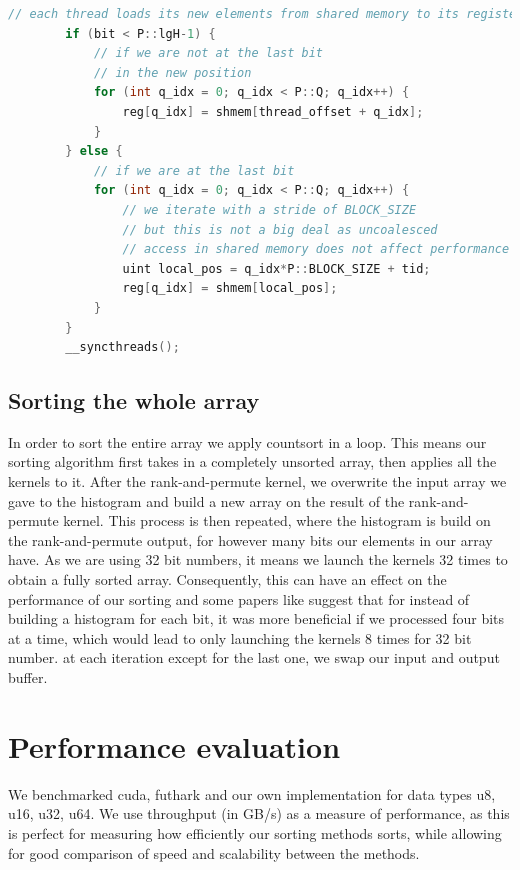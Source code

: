 \documentclass{article}
\begin{document}
\begin{lstlisting}[language=c++]
        // each thread loads its new elements from shared memory to its registers
        if (bit < P::lgH-1) {
            // if we are not at the last bit
            // in the new position
            for (int q_idx = 0; q_idx < P::Q; q_idx++) {
                reg[q_idx] = shmem[thread_offset + q_idx];
            }
        } else {
            // if we are at the last bit
            for (int q_idx = 0; q_idx < P::Q; q_idx++) {
                // we iterate with a stride of BLOCK_SIZE
                // but this is not a big deal as uncoalesced 
                // access in shared memory does not affect performance
                uint local_pos = q_idx*P::BLOCK_SIZE + tid;
                reg[q_idx] = shmem[local_pos];
            }
        }
        __syncthreads();
\end{lstlisting}


\subsection{Sorting the whole array}


In order to sort the entire array we apply countsort in a loop. 
This means our sorting algorithm first takes in a completely unsorted array, then applies all the kernels to it. 
After the rank-and-permute kernel, we overwrite the input array we gave to the histogram and build a new array on the result of the rank-and-permute kernel. 
This process is then repeated, where the histogram is build on the rank-and-permute output, for however many bits our elements in our array have. 
As we are using 32 bit numbers, it means we launch the kernels 32 times to obtain a fully sorted array. 
Consequently, this can have an effect on the performance of our sorting and some papers like \cite{satish} suggest that for instead of building a histogram for each bit, it was more beneficial if we processed four bits at a time, which would lead to only launching the kernels 8 times for 32 bit number. 
at each iteration except for the last one, we swap our input and output buffer.


\section{Performance evaluation}
We benchmarked cuda, futhark and our own implementation for data types u8, u16, u32, u64.
We use throughput (in GB/s) as a measure of performance, as this is perfect for measuring how efficiently our sorting methods sorts, while allowing for good comparison of speed and scalability between the methods.
\end{document}
